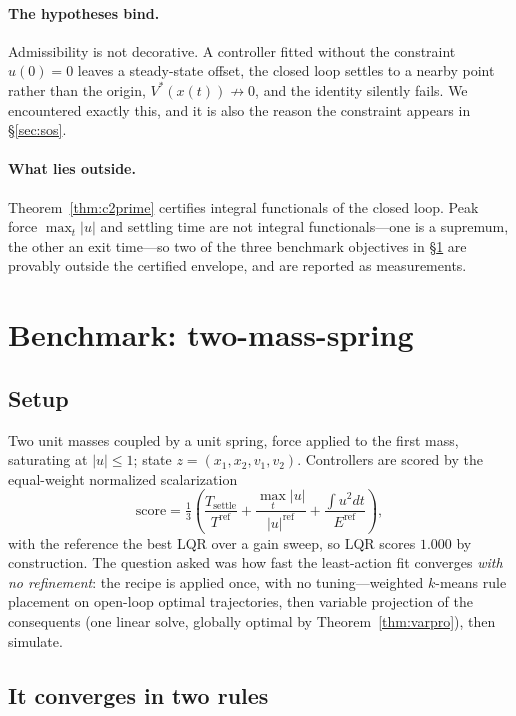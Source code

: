 \documentclass[11pt]{article}
\theoremstyle{plain}
\theoremstyle{definition}
\begin{document}
\paragraph{The hypotheses bind.} Admissibility is not decorative. A controller
fitted without the constraint $u(0)=0$ leaves a steady-state offset, the closed
loop settles to a nearby point rather than the origin, $V^{*}(x(t))\not\to0$,
and the identity silently fails. We encountered exactly this, and it is also the
reason the constraint appears in \S\ref{sec:sos}.

\paragraph{What lies outside.} Theorem~\ref{thm:c2prime} certifies integral
functionals of the closed loop. Peak force $\max_t|u|$ and settling time are not
integral functionals---one is a supremum, the other an exit time---so two of the
three benchmark objectives in \S\ref{sec:benchmark} are provably outside the
certified envelope, and are reported as measurements.

\section{Benchmark: two-mass-spring}
\label{sec:benchmark}

\subsection{Setup}

Two unit masses coupled by a unit spring, force applied to the first mass,
saturating at $|u|\le1$; state $z=(x_1,x_2,v_1,v_2)$. Controllers are scored by
the equal-weight normalized scalarization
\begin{equation}
\mathrm{score}=\tfrac13\left(
\frac{T_{\text{settle}}}{T^{\text{ref}}}
+\frac{\max_t|u|}{|u|^{\text{ref}}}
+\frac{\int u^2dt}{E^{\text{ref}}}\right),
\end{equation}
with the reference the best LQR over a gain sweep, so LQR scores $1.000$ by
construction. The question asked was how fast the least-action fit converges
\emph{with no refinement}: the recipe is applied once, with no tuning---weighted
$k$-means rule placement on open-loop optimal trajectories, then variable
projection of the consequents (one linear solve, globally optimal by
Theorem~\ref{thm:varpro}), then simulate.

\subsection{It converges in two rules}
\end{document}
